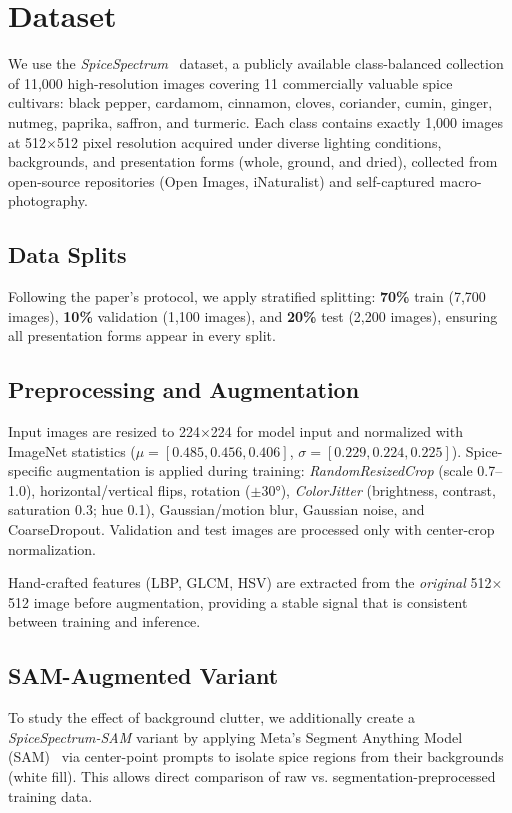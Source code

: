 \documentclass[conference]{IEEEtran}
\begin{document}
\section{Dataset}
\label{sec:dataset}

We use the \textit{SpiceSpectrum}~\cite{spicespectrum2025} dataset, a publicly
available class-balanced collection of 11,000 high-resolution images covering
11 commercially valuable spice cultivars: black pepper, cardamom, cinnamon, cloves,
coriander, cumin, ginger, nutmeg, paprika, saffron, and turmeric.
Each class contains exactly 1,000 images at 512$\times$512 pixel resolution
acquired under diverse lighting conditions, backgrounds, and presentation forms
(whole, ground, and dried), collected from open-source repositories
(Open Images, iNaturalist) and self-captured macro-photography.

\subsection{Data Splits}
Following the paper's protocol, we apply stratified splitting:
\textbf{70\%} train (7,700 images),
\textbf{10\%} validation (1,100 images), and
\textbf{20\%} test (2,200 images), ensuring all presentation forms appear in every
split.

\subsection{Preprocessing and Augmentation}
Input images are resized to 224$\times$224 for model input and normalized with
ImageNet statistics ($\mu = [0.485, 0.456, 0.406]$,
$\sigma = [0.229, 0.224, 0.225]$). Spice-specific augmentation
is applied during training:
\textit{RandomResizedCrop} (scale 0.7–1.0), horizontal/vertical flips,
rotation ($\pm 30°$), \textit{ColorJitter} (brightness, contrast, saturation 0.3;
hue 0.1), Gaussian/motion blur, Gaussian noise, and CoarseDropout.
Validation and test images are processed only with center-crop normalization.

Hand-crafted features (LBP, GLCM, HSV) are extracted from the \emph{original}
512$\times$512 image before augmentation, providing a stable signal that is
consistent between training and inference.

\subsection{SAM-Augmented Variant}
To study the effect of background clutter, we additionally create a
\textit{SpiceSpectrum-SAM} variant by applying Meta's Segment Anything Model
(SAM)~\cite{kirillov2023segment} via center-point prompts to isolate spice regions
from their backgrounds (white fill). This allows direct comparison of raw vs.
segmentation-preprocessed training data.
\end{document}
